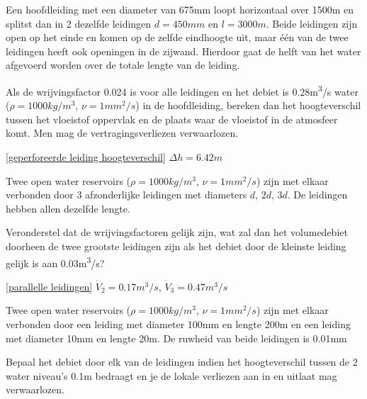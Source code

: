 \begin{toepassing}
	\label{geperforeerde leiding hoogteverschil}
Een hoofdleiding met een diameter van 675mm loopt horizontaal over 1500m en splitst dan in 2 dezelfde leidingen $d=450\unit{mm}$ en $l=3000\unit{m}$. Beide leidingen zijn open op het einde en komen op de zelfde eindhoogte uit, maar één van de twee leidingen heeft ook openingen in de zijwand. Hierdoor gaat de helft van het water afgevoerd worden over de totale lengte van de leiding.

Als de wrijvingsfactor 0.024 is voor alle leidingen en het debiet is 0.28\unit{m^3/s} water ($\rho=1000\unit{kg/m^3}$, $\nu=1\unit{mm^2/s}$) in de hoofdleiding, bereken dan het hoogteverschil tussen het vloeistof oppervlak en de plaats waar de vloeistof in de atmosfeer komt. Men mag de vertragingsverliezen verwaarlozen.
\end{toepassing}
\begin{antwoord}{\ref{geperforeerde leiding hoogteverschil}}
	$\Delta h = 6.42\unit{m}$
\end{antwoord}
\begin{toepassing}
	\label{parallelle leidingen}
Twee open water reservoirs ($\rho=1000\unit{kg/m^3}$, $\nu=1\unit{mm^2/s}$) zijn met elkaar verbonden door 3 afzonderlijke leidingen met diameters $d$, $2d$, $3d$. De leidingen hebben allen dezelfde lengte.
		
Veronderstel dat de wrijvingsfactoren gelijk zijn, wat zal dan het volumedebiet doorheen de twee grootste leidingen zijn als het debiet door de kleinste leiding gelijk is aan 0.03\unit{m^3/s}? 
\end{toepassing}
\begin{antwoord}{\ref{parallelle leidingen}}
	$\dot{V}_2 = 0.17\unit{m^3/s}$, $\dot{V}_3 = 0.47\unit{m^3/s}$
\end{antwoord}
\begin{toepassing}[*]
	\label{turbulent laminair}
	Twee open water reservoirs ($\rho=1000\unit{kg/m^3}$, $\nu=1\unit{mm^2/s}$) zijn met elkaar verbonden door een leiding met diameter 100mm en lengte 200m en een leiding met diameter 10mm en lengte 20m. De ruwheid van beide leidingen is 0.01mm
	
Bepaal het debiet door elk van de leidingen indien het hoogteverschil tussen de 2 water niveau's 0.1m bedraagt en je de lokale verliezen aan in en uitlaat mag verwaarlozen.
\end{toepassing}
